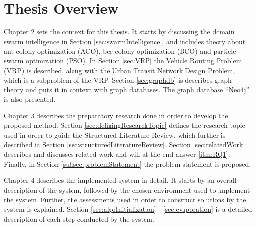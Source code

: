 \section{Thesis Overview}



Chapter 2 sets the context for this thesis. It starts by discussing the domain swarm intelligence in Section \ref{sec:swarmIntelligence}, and includes theory about ant colony optimization (ACO), bee colony optimization (BCO) and particle swarm optimization (PSO). In Section \ref{sec:VRP} the Vehicle Routing Problem (VRP) is described, along with the Urban Transit Network Design Problem, which is a subproblem of the VRP. Section \ref{sec:graphdb} is describes graph theory and puts it in context with graph databases. The graph database ``Neo4j'' is also presented. 

Chapter 3 describes the preparatory research done in order to develop the proposed method. Section \ref{sec:definingResearchTopic} defines the research topic used in order to guide the Structured Literature Review\citep{kofod2014}, which further is described in Section \ref{sec:structuredLiteratureReview}. Section \ref{sec:relatedWork} describes and discusses related work and will at the end answer \ref{itm:RQ1}. Finally, in Section \ref{subsec:problemStatement} the problem statement is proposed.  

Chapter 4 describes the implemented system in detail. It starts by an overall description of the system, followed by the chosen environment used to implement the system. Further, the assessments used in order to construct solutions by the system is explained. Section \ref{sec:algoInitialization} - \ref{sec:evaporation} is a detailed description of each step conducted by the system.



